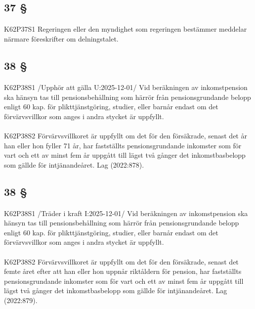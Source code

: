 \documentclass[a4paper,notitlepage,openany,10pt]{book}
\begin{document}
\subsection*{37 §}
\paragraph*{}
{\tiny K62P37S1}
Regeringen eller den myndighet som regeringen bestämmer meddelar närmare föreskrifter om delningstalet.
\subsection*{38 §}
\paragraph*{}
{\tiny K62P38S1}
/Upphör att gälla U:2025-12-01/
Vid beräkningen av inkomstpension ska hänsyn tas till pensionsbehållning som härrör från pensionsgrundande belopp enligt 60 kap. för plikttjänstgöring, studier, eller barnår endast om det förvärvsvillkor som anges i andra stycket är uppfyllt.
\paragraph*{}
{\tiny K62P38S2}
Förvärvsvillkoret är uppfyllt om det för den försäkrade, senast det år han eller hon fyller 71 år, har fastställts pensionsgrundande inkomster som för vart och ett av minst fem år uppgått till lägst två gånger det inkomstbasbelopp som gällde för intjänandeåret.
Lag (2022:878).
\subsection*{38 §}
\paragraph*{}
{\tiny K62P38S1}
/Träder i kraft I:2025-12-01/
Vid beräkningen av inkomstpension ska hänsyn tas till pensionsbehållning som härrör från pensionsgrundande belopp enligt 60 kap. för plikttjänstgöring, studier, eller barnår endast om det förvärvsvillkor som anges i andra stycket är uppfyllt.
\paragraph*{}
{\tiny K62P38S2}
Förvärvsvillkoret är uppfyllt om det för den försäkrade, senast det femte året efter att han eller hon uppnår riktåldern för pension, har fastställts pensionsgrundande inkomster som för vart och ett av minst fem år uppgått till lägst två gånger det inkomstbasbelopp som gällde för intjänandeåret.
Lag (2022:879).
\end{document}

